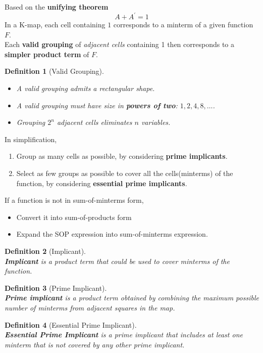 \documentclass[12pt]{article}
\newtheorem{definition}{Definition}[section]
\theoremstyle{definition}
\begin{document}
Based on the \textbf{unifying theorem}
\[
A+A^\prime = 1
\]
In a K-map, each cell containing $1$ corresponds to a minterm of a given function $F$.\\
Each \textbf{valid grouping} of \textit{adjacent cells} containing 1 then corresponds to a \textbf{simpler product term} of $F$.
\begin{definition}[Valid Grouping]
\hfill\\\normalfont
\begin{itemize}
  \item A valid grouping admits a rectangular shape.
\item A valid grouping must have size in \textbf{powers of two}: $1,2,4,8,\ldots$.
\item Grouping $2^n$ adjacent cells eliminates $n$ variables.
\end{itemize}
\end{definition} 
In simplification, 
\begin{enumerate}
  \item Group as many cells as possible, by considering \textbf{prime implicants}.
  \item Select as few groups as possible to cover all the cells(minterms) of the function, by considering \textbf{essential prime implicants}.
\end{enumerate}
If a function is not in sum-of-minterms form,
\begin{itemize}
  \item Convert it into sum-of-products form
  \item Expand the SOP expression into sum-of-minterms expression.
\end{itemize}
\begin{definition}[Implicant]
\hfill\\\normalfont \textbf{Implicant} is a product term that could be used to cover minterms of the function.
\end{definition}
\begin{definition}[Prime Implicant]
\hfill\\\normalfont \textbf{Prime implicant} is a product term obtained by combining
the \textit{maximum} possible number of minterms from adjacent squares in the map.
\end{definition}
\begin{definition}[Essential Prime Implicant]
\hfill\\\normalfont \textbf{Essential Prime Implicant} is a prime implicant that includes at least one minterm that is not covered by any other prime implicant.
\end{definition}
\end{document}
